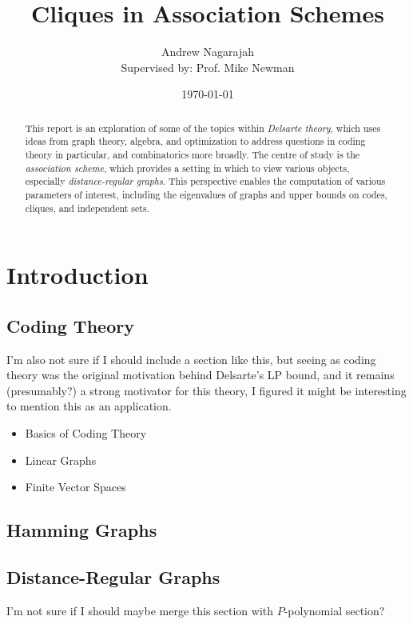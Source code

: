 \documentclass{report}
\title{Cliques in Association Schemes}
\author{
  Andrew Nagarajah \\
  Supervised by: Prof. Mike Newman
}
\date{\today}
\begin{document}
\maketitle

\begin{abstract}

  This report is an exploration of some of the topics within \emph{Delsarte
  theory}, which uses ideas from graph theory, algebra, and optimization to
  address questions in coding theory in particular, and combinatorics more
  broadly.  The centre of study is the \emph{association scheme}, which provides
  a setting in which to view various objects, especially \emph{distance-regular
  graphs}.  This perspective enables the computation of various parameters of
  interest, including the eigenvalues of graphs and upper bounds on codes,
  cliques, and independent sets.

\end{abstract}

\tableofcontents

\chapter{Introduction}
  \section{Coding Theory}
    I'm also not sure if I should include a section like this, but seeing as
    coding theory was the original motivation behind Delsarte's LP bound,
    and it remains (presumably?) a strong motivator for this theory,
    I figured it might be interesting to mention this as an application.

    \begin{itemize}
      \item Basics of Coding Theory
      \item Linear Graphs
      \item Finite Vector Spaces
    \end{itemize}

  \section{Hamming Graphs}

  \section{Distance-Regular Graphs}
    I'm not sure if I should maybe merge this section with $P$-polynomial
    section?
\end{document}
